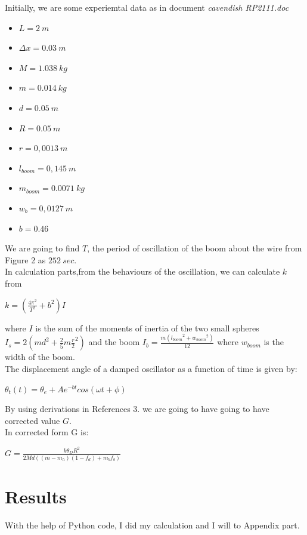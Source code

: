 \documentclass[aps,twocolumn,secnumarabic,nobalancelastpage,amsmath,amssymb,
nofootinbib]{revtex4}
\begin{document}
Initially, we are some experiemtal data as in document \emph{cavendish RP2111.doc}
\begin{itemize}
\item $L=2\ m$
\item $\Delta{x}=0.03\ m$
\item $M=1.038\ kg$
\item $m=0.014\ kg$
\item $d=0.05\ m$
\item $R=0.05\ m$
\item $r= 0,0013\ m$
\item ${l}_{boom}=0,145\ m$ 
\item ${m}_{boom}=0.0071\ kg$
\item ${w}_{b}=0,0127\ m$
\item $b=0.46$
\end{itemize}

We are going to find $T$, the period of oscillation of the boom about the wire from Figure 2 as $252\ sec$.\\

In calculation parts,from the behaviours of the oscillation, we can calculate $k$ from
\begin{center}
$k=\left( \frac { 4{ \pi  }^{ 2 } }{ { T }^{ 2 } } +{ b }^{ 2 } \right) I$
\end{center}

where $I$ is the sum of the moments of inertia of the two small spheres ${ I }_{ s }=2\left( { m }{ d }^{ 2 }+\frac { 2 }{ 5 } m{ \frac{r}{2}}^{ 2 } \right) $ and the boom $ { I }_{ b }=\frac { m({ { l }_{ boom } }^{ 2 }+{ { w }_{ boom } }^{ 2 }) }{ 12 } $ where ${w}_{boom}$ is the width of the boom.\\

The displacement angle of a damped oscillator as a function of time is given by:
\begin{center}
$ \theta_{t}(t)=\theta_{e}+Ae^{-bt } cos(\omega{t}+\phi)$
\end{center}

By using derivations in References 3. we are going to have going to have corrected value $G$.\\

In corrected  form G is:

\begin{center}
$ G=\frac{k{\theta}_{D}{R}^{2}}{2Md((m-{m}_{h})(1-{f}_{d})+{m}_{b}{f}_{b})}$
\end{center}

\section{Results}
With the help of Python code, I did my calculation and I will  to Appendix part.\\
\end{document}
